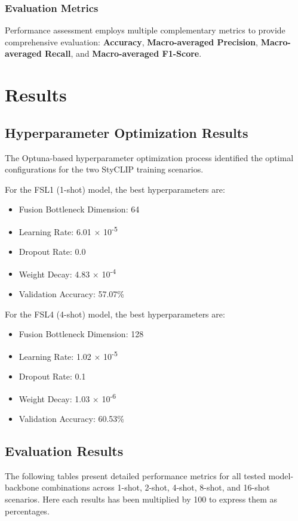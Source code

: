 \documentclass[conference,6pt]{IEEEtran}
\begin{document}
\subsubsection{Evaluation Metrics}

Performance assessment employs multiple complementary metrics to provide comprehensive evaluation: \textbf{Accuracy}, \textbf{Macro-averaged Precision}, \textbf{Macro-averaged Recall}, and \textbf{Macro-averaged F1-Score}. 

\section{Results}
\subsection{Hyperparameter Optimization Results}

The Optuna-based hyperparameter optimization process identified the optimal configurations for the two StyCLIP training scenarios.

For the FSL1 (1-shot) model, the best hyperparameters are:
\begin{itemize}
    \item Fusion Bottleneck Dimension: 64
    \item Learning Rate: 6.01 × 10\textsuperscript{-5}
    \item Dropout Rate: 0.0
    \item Weight Decay: 4.83 × 10\textsuperscript{-4}
    \item Validation Accuracy: 57.07\%
\end{itemize}

For the FSL4 (4-shot) model, the best hyperparameters are:
\begin{itemize}
    \item Fusion Bottleneck Dimension: 128
    \item Learning Rate: 1.02 × 10\textsuperscript{-5}
    \item Dropout Rate: 0.1
    \item Weight Decay: 1.03 × 10\textsuperscript{-6}
    \item Validation Accuracy: 60.53\%
\end{itemize}

\subsection{Evaluation Results}
The following tables present detailed performance metrics for all tested model-backbone combinations across 1-shot, 2-shot, 4-shot, 8-shot, and 16-shot scenarios. Here each results has been multiplied by 100 to express them as percentages.
\end{document}
